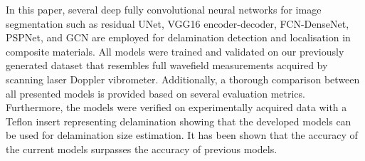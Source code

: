 In this paper, several deep fully convolutional neural networks for image segmentation such as residual UNet, VGG16 encoder-decoder, FCN-DenseNet, PSPNet, and GCN are employed for delamination detection and localisation in composite materials.
All models were trained and validated on our previously generated dataset that resembles full wavefield measurements acquired by scanning laser Doppler vibrometer.
Additionally, a thorough comparison between all presented models is provided based on several evaluation metrics.
Furthermore, the models were verified on experimentally acquired data with a Teflon insert representing delamination showing that the developed models can be used for delamination size estimation.
It has been shown that the accuracy of the current models surpasses the accuracy of previous models. 

